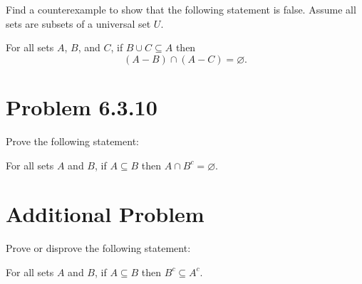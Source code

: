 \documentclass[11pt]{article}
\begin{document}
Find a counterexample to show that the following statement is false. Assume all sets are subsets of a universal set $U$.

For all sets $A$, $B$, and $C$, if $B \cup C \subseteq A$ then
\[(A - B) \cap (A - C) = \varnothing.\]

\section*{Problem 6.3.10}

Prove the following statement:

For all sets $A$ and $B$, if $A \subseteq B$ then $A \cap B^{c} = \varnothing$.

\section*{Additional Problem}

Prove or disprove the following statement:

For all sets $A$ and $B$, if $A \subseteq B$ then $B^{c} \subseteq A^{c}$.
\end{document}
